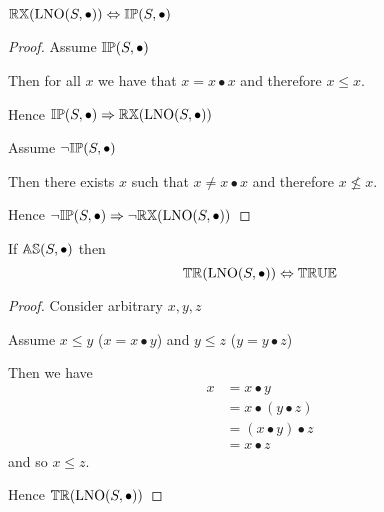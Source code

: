 
\begin{theorem} \label{thm:lno_reflexive}
${\mathbb{RX}}(\mathrm{LNO}(S,\bullet)) \Leftrightarrow {\mathbb{IP}}(S, \bullet)$
\end{theorem}

\begin{proof}

\vspace{0.5em}

Assume ${\mathbb{IP}}(S,\bullet)$
\begin{ind}
Then for all $x$ we have that $x = x \bullet x$ and therefore $x \leq x$.
\end{ind}
Hence ${\mathbb{IP}}(S,\bullet) \Rightarrow {\mathbb{RX}}(\mathrm{LNO}(S,\bullet))$

\vspace{2em}

Assume $\neg {\mathbb{IP}}(S,\bullet)$
\begin{ind}
Then there exists $x$ such that $x \neq x \bullet x$ and therefore $x \nleq x$.
\end{ind}
Hence $\neg {\mathbb{IP}}(S,\bullet) \Rightarrow \neg {\mathbb{RX}}(\mathrm{LNO}(S,\bullet))$

\end{proof}





\begin{theorem} \label{thm:lno_transitive}
If ${\mathbb{AS}}(S, \bullet)$ then
\begin{equation*}
{\mathbb{TR}}(\mathrm{LNO}(S,\bullet)) \Leftrightarrow  {\mathbb{TRUE}}
\end{equation*}
\end{theorem}

\begin{proof}

\vspace{0.5em}

Consider arbitrary $x,y,z$
\begin{ind}
Assume $x \leq y$ ($x = x \bullet y$) and $y \leq z$ ($y = y \bullet z$)

\begin{ind}
Then we have
\begin{align*}
x 	& = x \bullet y \\
	& = x \bullet (y \bullet z) \\
	& = (x \bullet y) \bullet z \\
	& = x \bullet z
\end{align*}
and so $x \leq z$.

\end{ind}
\end{ind}

Hence ${\mathbb{TR}}(\mathrm{LNO}(S,\bullet))$
\end{proof}





